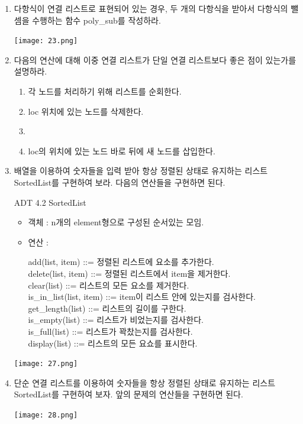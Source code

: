\documentclass[11pt,a4paper]{article}
\begin{document}
\begin{enumerate}
\item 다항식이 연결 리스트로 표현되어 있는 경우, 두 개의 다항식을 받아서 다항식의 뺄셈을 수행하는 함수 poly\_sub를 작성하라.

\texttt{[image: 23.png]}

\item 다음의 연산에 대해 이중 연결 리스트가 단일 연결 리스트보다 좋은 점이 있는가를 설명하라.
\begin{enumerate}
	\item 각 노드를 처리하기 위해 리스트를 순회한다.
	\item loc 위치에 있는 노드를 삭제한다.
	\item {}
	\item loc의 위치에 있는 노드 바로 뒤에 새 노드를 삽입한다.
\end{enumerate}
	
\item 배열을 이용하여 숫자들을 입력 받아 항상 정렬된 상태로 유지하는 리스트 SortedList를 구현하여 보라. 다음의 연산들을 구현하면 된다.

ADT 4.2 SortedList
\begin{itemize}
	\item 객체 : n개의 element형으로 구성된 순서있는 모임.
	\item 연산 :
	
	add(list, item) ::= 정렬된 리스트에 요소를 추가한다.\\
	delete(list, item) ::= 정렬된 리스트에서 item을 제거한다.\\
	clear(list) ::= 리스트의 모든 요소를 제거한다.\\
	is\_in\_list(list, item) ::= item이 리스트 안에 있는지를 검사한다.\\
	get\_length(list) ::= 리스트의 길이를 구한다.\\
	is\_empty(list) ::= 리스트가 비었는지를 검사한다.\\
	is\_full(list) ::= 리스트가 꽉찼는지를 검사한다.\\
	display(list) ::= 리스트의 모든 요쇼를 표시한다.
\end{itemize}


\texttt{[image: 27.png]}

\item 단순 연결 리스트를 이용하여 숫자들을 항상 정렬된 상태로 유지하는 리스트 SortedList를 구현하여 보자.
앞의 문제의 연산들을 구현하면 된다.

\texttt{[image: 28.png]}


\end{enumerate}
\end{document}
